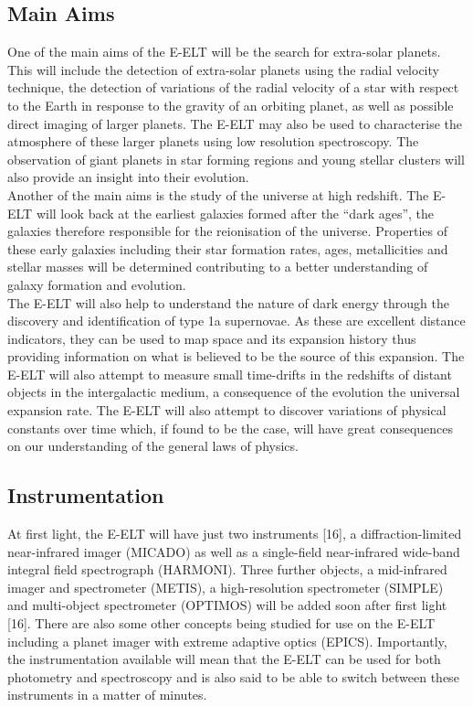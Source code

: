 \documentclass[pdf,color]{UoBnote}
\begin{document}
\subsection{Main Aims}
One of the main aims of the E-ELT will be the search for extra-solar planets.  This will include the detection of extra-solar planets using the radial velocity technique, the detection of variations of the radial velocity of a star with respect to the Earth in response to the gravity of an orbiting planet, as well as possible direct imaging of larger planets. The E-ELT may also be used to characterise the atmosphere of these larger planets using low resolution spectroscopy. The observation of giant planets in star forming regions and young stellar clusters will also provide an insight into their evolution.\\
\newline
Another of the main aims is the study of the universe at high redshift. The E-ELT will look back at the earliest galaxies formed after the “dark ages”, the galaxies therefore responsible for the reionisation of the universe. Properties of these early galaxies including their star formation rates, ages, metallicities and stellar masses will be determined contributing to a better understanding of galaxy formation and evolution.  \\
\newline
 The E-ELT will also help to understand the nature of dark energy through the discovery and identification of type 1a supernovae. As these are excellent distance indicators, they can be used to map space and its expansion history thus providing information on what is believed to be the source of this expansion. The E-ELT will also attempt to measure small time-drifts in the redshifts of distant objects in the intergalactic medium, a consequence of the evolution the universal expansion rate. The E-ELT will also attempt to discover variations of physical constants over time which, if found to be the case, will have great consequences on our understanding of the general laws of physics.  

\subsection{Instrumentation}
At first light, the E-ELT will have just two instruments [16], a diffraction-limited near-infrared imager (MICADO) as well as a single-field near-infrared wide-band integral field spectrograph (HARMONI). Three further objects, a mid-infrared imager and spectrometer (METIS), a high-resolution spectrometer (SIMPLE) and multi-object spectrometer (OPTIMOS) will be added soon after first light [16]. There are also some other concepts being studied for use on the E-ELT including a planet imager with extreme adaptive optics (EPICS). Importantly, the instrumentation available will mean that the E-ELT can be used for both photometry and spectroscopy and is also said to be able to switch between these instruments in a matter of minutes.
\end{document}
